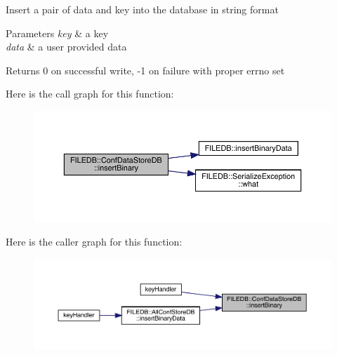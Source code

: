 Insert a pair of data and key into the database in string format 
\begin{DoxyParams}{Parameters}
{\em key} & a key \\
\hline
{\em data} & a user provided data\\
\hline
\end{DoxyParams}
\begin{DoxyReturn}{Returns}
0 on successful write, -\/1 on failure with proper errno set 
\end{DoxyReturn}
Here is the call graph for this function\+:
\nopagebreak
\begin{figure}[H]
\begin{center}
\leavevmode
\includegraphics[width=350pt]{d8/d19/classFILEDB_1_1ConfDataStoreDB_a82fea8d8ac1a2c096614b213087a73d2_cgraph}
\end{center}
\end{figure}
Here is the caller graph for this function\+:
\nopagebreak
\begin{figure}[H]
\begin{center}
\leavevmode
\includegraphics[width=350pt]{d8/d19/classFILEDB_1_1ConfDataStoreDB_a82fea8d8ac1a2c096614b213087a73d2_icgraph}
\end{center}
\end{figure}
\mbox{\label{classFILEDB_1_1ConfDataStoreDB_a8fa05198f3ff1f405fbdfc6a51f43d1a}} 
